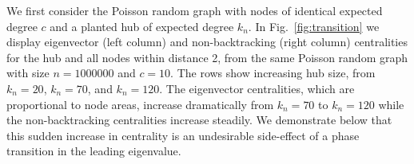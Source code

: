 \documentclass[twocolumn,prl,superscriptaddress]{revtex4}
\begin{document}
We first consider the Poisson random graph with nodes of identical expected degree $c$ and a planted hub of expected degree $k_n$. In Fig.~\ref{fig:transition} we display eigenvector (left column) and non-backtracking (right column) centralities for the hub and all nodes within distance 2, from the same Poisson random graph with size $n=1000000$ and $c = 10$. The rows show increasing hub size, from $k_n = 20$, $k_n = 70$, and $k_n = 120$. The eigenvector centralities, which are proportional to node areas, increase dramatically from $k_n = 70$ to $k_n = 120$ while the non-backtracking centralities increase steadily. We demonstrate below that this sudden increase in centrality is an undesirable side-effect of a phase transition in the leading eigenvalue.

\end{document}
